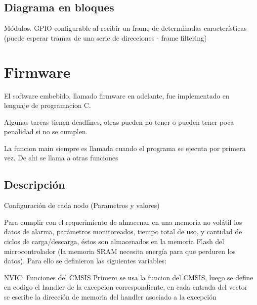 \subsection{Diagrama en bloques}
\label{subsec:bloques} 
Módulos. 
GPIO configurable al recibir un frame de determinadas características (puede esperar tramas de una serie de direcciones - frame filtering)


\section{Firmware}
\label{sec:firm}
El software embebido, llamado firmware en adelante, fue implementado en lenguaje de programacion C.

Algunas tareas tienen deadlines, otras pueden no tener o pueden tener poca penalidad si no se cumplen.


La funcion main siempre es llamada cuando el programa se ejecuta por primera vez. De ahi se llama a otras funciones

\subsection{Descripción}
\label{subsec:desc} 

Configuración de cada nodo (Parametros y valores)

Para cumplir con el requerimiento de almacenar en una memoria no volátil los datos de alarma, parámetros monitoreados, tiempo total de uso, y cantidad de ciclos de carga/descarga, éstos son almacenados en la memoria Flash del microcontrolador (la memoria SRAM necesita energía para que perduren los datos). Para ello se definieron las siguientes variables:
    
NVIC: Funciones del CMSIS
Primero se usa la funcion del CMSIS, luego se define en codigo el handler de la excepcion correspondiente, en cada entrada del vector se escribe la dirección de memoria del handler asociado a la excepción 

